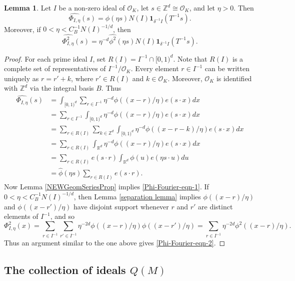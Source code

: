 \documentclass{amsart}
\numberwithin{equation}{section}
\theoremstyle{definition}
\newtheorem{lemma}[theorem]{Lemma}
\theoremstyle{definition}
\def\RR{\mathbb{R}}
\def\ZZ{\mathbb{Z}}
\newcommand{\OK}{\mathcal{O}_K}
\newcommand{\isom}{\cong}
\begin{document}
\begin{lemma}\label{Phi-Fourier-Lemma}
Let $I$ be a non-zero ideal of $\OK$, let $s \in \ZZ^d \isom \OK$, and let 
$\eta > 0$. Then 
\begin{equation}\label{Phi-Fourier-eqn-1}
\widehat{\Phi_{I,\eta}}(s) = \widehat{\phi}(\eta s) N(I)\mathbf{1}_{\delta^{-1}I} (T^{-1} s). 
\end{equation}
Moreover, if $0 < \eta < C_B^{-1}N(I)^{-1/d}$, then  
\begin{equation}\label{Phi-Fourier-eqn-2}
\widehat{\Phi_{I,\eta}^2}(s) = \eta^{-d} \widehat{\phi^2}(\eta s) N(I)\mathbf{1}_{\delta^{-1}I} (T^{-1} s).
\end{equation}
\end{lemma}
\begin{proof}
For each prime ideal $I$, set $R(I) = I^{-1} \cap [0,1)^d$. Note that $R(I)$ is a complete set of representatives of $I^{-1} / \OK$. 
Every element $r \in I^{-1}$ can be written uniquely as $r=r'+k$, where $r' \in R(I)$ and $k \in \OK$. Moreover, $\OK$ is identified with $\ZZ^d$ via the integral basis $B$. Thus 
\begin{align*}
\widehat{\Phi_{I,\eta}}(s)
&=
\int_{[0,1)^d} \sum_{r \in I^{-1}}  \eta^{-d} \phi ((x-r)/\eta) e(s \cdot x)  dx
\\
&=
\sum_{r \in I^{-1}}  \int_{[0,1)^d}  \eta^{-d} \phi ((x-r)/\eta) e(s \cdot x)  dx
\\
&=
\sum_{r \in R(I)} \sum_{k \in \ZZ^d}  \int_{[0,1)^d}  \eta^{-d} \phi ((x - r - k)/\eta) e(s \cdot x)  dx
\\
&=
\sum_{r \in R(I)} \int_{\RR^d}  \eta^{-d} \phi ((x - r)/\eta) e(s \cdot x)  dx
\\
&=
\sum_{r \in R(I)}  e(s \cdot r) \int_{\RR^d}  \phi (u) e(\eta s \cdot u)  du
\\ 
&= 
\widehat{\phi} (\eta s) \sum_{r \in R(I)} e(s \cdot r).
\end{align*}
Now Lemma \ref{NEWGeomSeriesProp} implies \eqref{Phi-Fourier-eqn-1}. 
%
%
If $0 < \eta < C_B^{-1}N(I)^{-1/d}$, then Lemma \ref{separation lemma} implies $\phi((x-r)/\eta)$ and $\phi((x-r')/\eta)$ have disjoint support whenever $r$ and $r'$ are distinct elements of $I^{-1}$, and so 
$$
\Phi_{I,\eta}^2(x) = \sum_{r \in I^{-1}} \sum_{r' \in I^{-1}} \eta^{-2d} \phi((x-r)/\eta) \phi((x-r')/\eta) = \sum_{r \in I^{-1}} \eta^{-2d} \phi^2((x-r)/\eta). 
$$ 
Thus an argument similar to the one above gives \eqref{Phi-Fourier-eqn-2}.
\end{proof}


\subsection{The collection of ideals \texorpdfstring{$Q(M)$}{Q(M)}}
\end{document}
